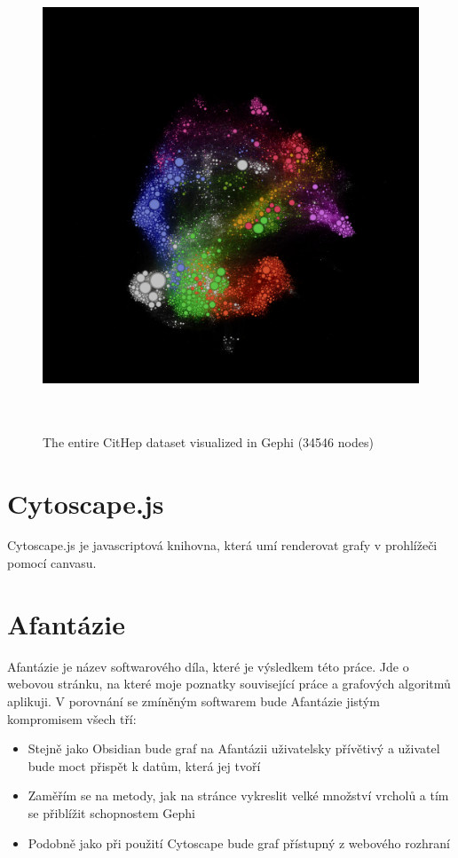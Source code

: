 \begin{figure}[p]\centering
  \includegraphics[width=140mm, height=140mm]{img/gephi_cithep_35k.png}
  \caption{The entire CitHep dataset visualized in Gephi (34546 nodes)}
  \label{obr:gephi_cithep}
\end{figure}


\section{Cytoscape.js}
Cytoscape.js je javascriptová knihovna, která umí renderovat grafy v prohlížeči pomocí canvasu. 

\section{Afantázie}

Afantázie je název softwarového díla, které je výsledkem této práce. Jde o webovou stránku, na které moje poznatky související práce a grafových algoritmů aplikuji.
V porovnání se zmíněným softwarem bude Afantázie jistým kompromisem všech tří:

\begin{itemize}
  \item Stejně jako Obsidian bude graf na Afantázii uživatelsky přívětivý a uživatel bude moct přispět k datům, která jej tvoří
  \item Zaměřím se na metody, jak na stránce vykreslit velké množství vrcholů a tím se přiblížit schopnostem Gephi
  \item Podobně jako při použití Cytoscape bude graf přístupný z webového rozhraní
\end{itemize}
